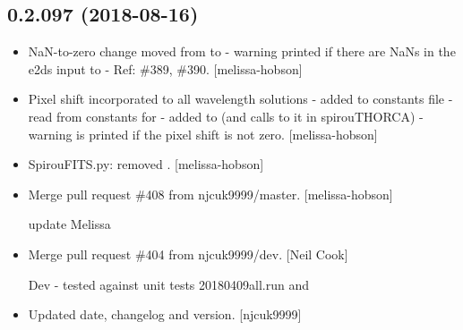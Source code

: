 \documentclass[a4paper,10pt,english]{report}
\begin{document}
\subsection{0.2.097 (2018-08-16)}
\label{\detokenize{misc/changelog:id368}}\begin{itemize}
\item {} 
NaN-to-zero change moved from  to  - warning
printed if there are NaNs in the e2ds input to  - Ref: \#389,
\#390. {[}melissa-hobson{]}

\item {} 
Pixel shift incorporated to all wavelength solutions - added to
constants file - read from constants for  -
added to  (and calls to it in
spirouTHORCA) - warning is printed if the pixel shift is not zero.
{[}melissa-hobson{]}

\item {} 
SpirouFITS.py: removed . {[}melissa-hobson{]}

\item {} 
Merge pull request \#408 from njcuk9999/master. {[}melissa-hobson{]}

update Melissa

\item {} 
Merge pull request \#404 from njcuk9999/dev. {[}Neil Cook{]}

Dev - tested against unit tests 20180409all.run and 

\item {} 
Updated date, changelog and version. {[}njcuk9999{]}

\end{itemize}
\end{document}
